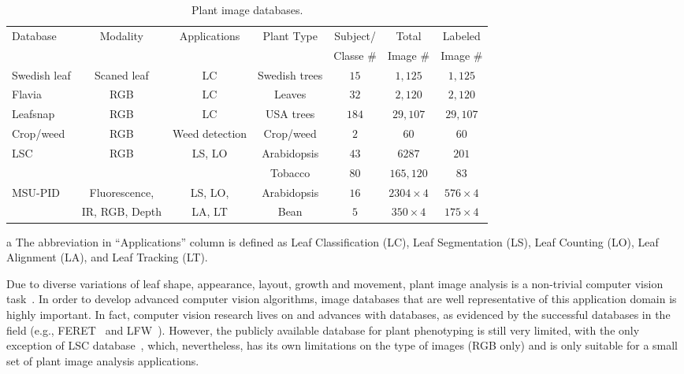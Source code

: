 \begin{table}[t!]
\centering
\begin{threeparttable}
\caption{Plant image databases.}
\begin{tabular}{l|c|c|c|c|c|c}
\hline
\multirow{2}{*}{Database}& \multirow{2}{*}{Modality} & \multirow{2}{*}{Applications}\tnote{a} & \multirow{2}{*}{Plant Type} & Subject/ &Total & Labeled \\ 
& & & & Classe \# & Image \# & Image \# \\ \hline
Swedish leaf & Scaned leaf & LC& Swedish trees & $15$ & $1,125$ & $1,125$ \\ \hline
Flavia& RGB & LC& Leaves & $32$ & $2,120$ & $2,120$ \\ \hline
Leafsnap & RGB & LC& USA trees & $184$ & $29,107$ & $29,107$ \\ \hline
Crop/weed & RGB &Weed detection & Crop/weed & $2$ & $60$ & $60$ \\ \hline
\multirow{2}{*}{LSC} & \multirow{2}{*}{RGB} & \multirow{2}{*}{LS, LO} & Arabidopsis & $43$ & $6287$ & $201$ \\ \cline{4-7}
& & & Tobacco & $80$ & $165,120$ & $83$ \\ \hline
\multirow{2}{*}{MSU-PID} & Fluorescence, & LS, LO, & Arabidopsis & $16$ & $2304\times 4$ & $576\times 4$ \\ \cline{4-7}
& IR, RGB, Depth & LA, LT & Bean & $5$ & $350\times 4$ & $175\times 4$ \\ \hline
\hline
\end{tabular}
\begin{tablenotes}
\footnotesize 
\item[a] The abbreviation in ``Applications'' column is defined as Leaf Classification (LC), Leaf Segmentation (LS), Leaf Counting (LO), Leaf Alignment (LA), and Leaf Tracking (LT).
\end{tablenotes}
\end{threeparttable}
\label{tab:database}
\end{table}

Due to diverse variations of leaf shape, appearance, layout, growth and movement, plant image analysis is a non-trivial computer vision task~\cite{Minervini2015}.
In order to develop advanced computer vision algorithms, image databases that are well representative of this application domain is highly important.
In fact, computer vision research lives on and advances with databases, as evidenced by the successful databases in the field (e.g., FERET~\cite{Phillips2000} and LFW~\cite{LFW}).
However, the publicly available database for plant phenotyping is still very limited, with the only exception of LSC database~\cite{scharr2014annotated}, which, nevertheless, has its own limitations on the type of images (RGB only) and is only suitable for a small set of plant image analysis applications.



